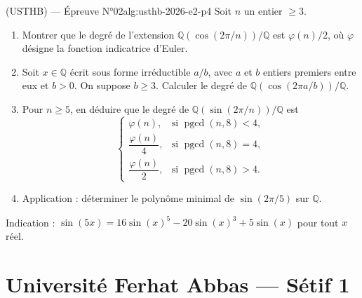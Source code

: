 \newpage

\begin{problem}{(USTHB) — Épreuve N°02}{alg:usthb-2026-e2-p4}
Soit $n$ un entier $\ge3$.
\begin{enumerate}
\item Montrer que le degré de l'extension
      $\mathbb{Q}(\cos(2\pi/n))/\mathbb{Q}$ est $\varphi(n)/2$, où $\varphi$ désigne
      la fonction indicatrice d'Euler.
\item Soit $x\in\mathbb{Q}$ écrit sous forme irréductible $a/b$, avec $a$ et $b$
      entiers premiers entre eux et $b>0$. On suppose $b\ge3$. Calculer le degré de
      $\mathbb{Q}(\cos(2\pi a/b))/\mathbb{Q}$.
\item Pour $n\ge5$, en déduire que le degré de
      $\mathbb{Q}(\sin(2\pi/n))/\mathbb{Q}$ est
      $$
      \begin{cases}
      \varphi(n), & \text{si } \operatorname{pgcd}(n,8)<4,\\
      \dfrac{\varphi(n)}4, & \text{si } \operatorname{pgcd}(n,8)=4,\\
      \dfrac{\varphi(n)}2, & \text{si } \operatorname{pgcd}(n,8)>4.
      \end{cases}
      $$
\item Application : déterminer le polynôme minimal de $\sin(2\pi/5)$ sur
      $\mathbb{Q}$.
\end{enumerate}
Indication : $\sin(5x)=16\sin(x)^5-20\sin(x)^3+5\sin(x)$ pour tout $x$ réel.

\end{problem}

\newpage

\section{Université Ferhat Abbas --- Sétif 1}

